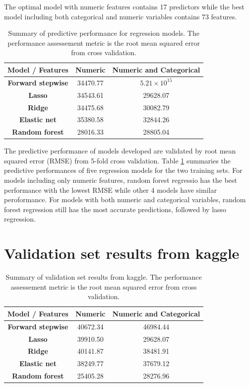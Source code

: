 \documentclass[letterpaper,12pt,twoside,]{pinp}
\begin{document}
The optimal model with numeric features contains 17 predictors while the
best model including both categorical and numeric variables contains 73
features.

\hspace{1cm}

\begin{table}
\begin{tabular}{ |c|c|c| } 
\hline
\textbf{Model / Features} & \textbf{Numeric} & \textbf{Numeric and Categorical} \\
\hline
\textbf{Forward stepwise} & 34470.77 & $5.21\times 10^{15}$ \\ 
\textbf{Lasso} & 34543.61 & 29628.07 \\
\textbf{Ridge} & 34475.68 & 30082.79 \\
\textbf{Elastic net} & 35380.58 & 32844.26 \\
\textbf{Random forest} & 28016.33 & 28805.04\\
\hline
\end{tabular}
\centering
\caption{Summary of predictive performance for regression models. The performance assessement metric is the root mean squared error from cross validation.}
\label{table:cv_errors}
\end{table}

The predictive performance of models developed are validated by root
mean squared error (RMSE) from 5-fold cross validation. Table
\ref{table:cv_errors} summaries the predictive performances of five
regression models for the two training sets. For models including only
numeric features, random forest regressio has the best performance with
the lowest RMSE while other 4 models have similar peroformance. For
models with both numeric and categorical variables, random forest
regression still has the most accurate predictions, followed by lasso
regression.

\hypertarget{validation-set-results-from-kaggle}{%
\section{Validation set results from
kaggle}\label{validation-set-results-from-kaggle}}

\begin{table}
\begin{tabular}{ |c|c|c| } 
\hline
\textbf{Model / Features} & \textbf{Numeric} & \textbf{Numeric and Categorical} \\
\hline
\textbf{Forward stepwise} & 40672.34  & 46984.44 \\ 
\textbf{Lasso} & 39910.50 & 29628.07 \\
\textbf{Ridge} & 40141.87 & 38481.91 \\
\textbf{Elastic net} & 38249.77 &  37679.12\\
\textbf{Random forest} & 25405.28 & 28276.96\\
\hline
\end{tabular}
\centering
\caption{Summary of validation set results from kaggle. The performance assessement metric is the root mean squared error from cross validation.}
\label{table:kaggle_results}
\end{table}
\end{document}
